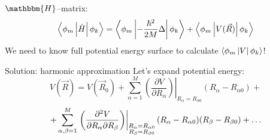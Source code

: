 \begin{frame}{  }
\begin{block}{$\mathbbm{H}$--matrix:}
$$\mymean{\phi_m}{\hat{H}}{\phi_k} = \mymean{\phi_m}%
					    {-\frac{\hbar^2}{2M}\Delta}%
					    {\phi_k}+%
                                     \mymean{\phi_m}{V(\vec{R})}{\phi_k}$$
We need to know full potential energy surface to calculate $\left\langle \phi_m \left| V \right| \phi_k \right\rangle$!
\end{block}
\begin{block}{Solution: harmonic approximation}
Let's expand potential energy:
$$V(\vec{R}) = V(\vec{R}_0) + %
		      \sum_{\alpha=1}^M\left.\left(\frac{\partial V}{\partial R_{\alpha}}\right)\right|_{R_{\alpha}=R_{\alpha 0}}%
		 		       (R_{\alpha} - R_{\alpha 0})+$$
$$+\sum_{\alpha,\beta=1}^M\left.\left(\frac{\partial^2 V}{\partial R_{\alpha}\partial R_{\beta}}\right)\right|_%
			  {\substack{R_{\alpha}=R_{\alpha 0}\\R_{\beta}=R_{\beta 0}}}%
			  (R_{\alpha}-R_{\alpha 0})(R_{\beta}-R_{\beta 0})+\ldots$$
\end{block}
\end{frame}


